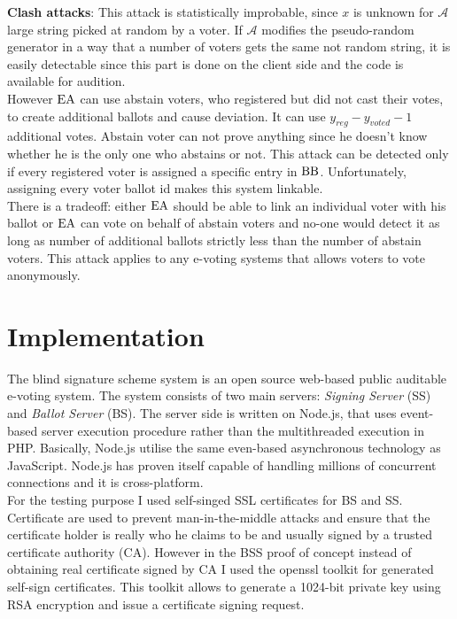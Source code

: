 \textbf{Clash attacks}: This attack is statistically improbable, since $x$ is unknown for $\mathcal{A}$ large string picked at random by a voter. If  $\mathcal{A}$ modifies the pseudo-random generator in a way that a number of voters gets the same not random string, it is easily detectable since  this part is done on the client side and the code is available for audition. \\

However $\operatorname{EA}$ can use abstain voters, who registered but did not cast their votes,  to create additional ballots and cause deviation. It can use $y_{reg} - y_{voted} -1$  additional votes. Abstain voter can not prove anything since he doesn't know whether he is the only one who abstains or not. This attack can be detected only if every registered voter is assigned a specific entry in $\operatorname{BB}$. Unfortunately,  assigning every voter ballot id makes this system linkable.\\

There is a tradeoff: either $\operatorname{EA}$ should be able to link an individual voter with his ballot or $\operatorname{EA}$ can vote on behalf of abstain voters and no-one would detect it as long as number of additional ballots strictly less than the number of abstain voters. This attack applies to any e-voting systems that allows voters to vote anonymously.  

\section{Implementation}
The blind signature scheme system is an open source web-based public auditable e-voting system. The system consists of two main servers: \textit{Signing Server} (SS) and \textit{Ballot Server} (BS). The server side is written on Node.js, that uses event-based server execution procedure rather than the multithreaded execution in PHP. Basically, Node.js utilise the same even-based  asynchronous technology as JavaScript. Node.js has proven itself capable of handling millions of concurrent connections and it is cross-platform.\\

For the testing purpose I used self-singed SSL certificates for BS and SS. Certificate are used to prevent man-in-the-middle attacks and ensure that the certificate holder is really who he claims to be and usually signed by a trusted certificate authority (CA). However in the BSS proof of concept instead of obtaining real certificate signed by CA I used the openssl toolkit for generated self-sign certificates. This toolkit allows to generate a 1024-bit private key using RSA encryption and issue a certificate signing request.\\ 

